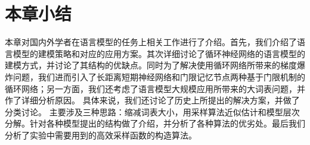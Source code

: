 \section{本章小结}
本章对国内外学者在语言模型的任务上相关工作进行了介绍。首先，我们介绍了语言模型的建模策略和对应的应用方案。其次详细讨论了循环神经网络的语言模型的建模方式，并讨论了其结构的优缺点。同时为了解决使用循环网络所带来的梯度爆炸问题，我们进而引入了长距离短期神经网络和门限记忆节点两种基于门限机制的循环网络；另一方面，我们还考虑了语言模型大规模应用所带来的大词表问题，并作了详细分析原因。
具体来说，我们还讨论了历史上所提出的解决方案，并做了分类讨论。
主要涉及三种思路：缩减词表大小，用采样算法近似估计和模型层次分解。针对各种模型提出的结构做了介绍，并分析了各种算法的优劣处。最后我们分析了实验中需要用到的高效采样函数的构造算法。